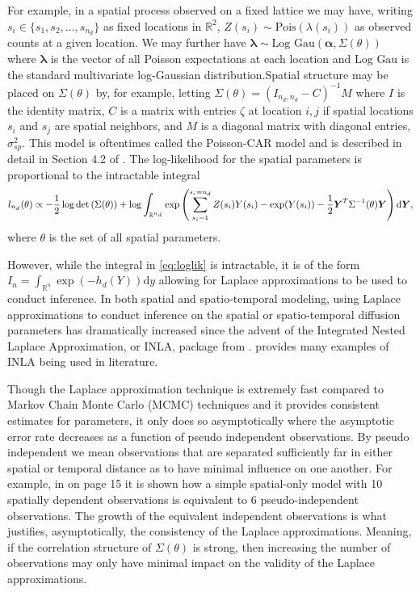 \documentclass[11pt]{isuthesis}
\begin{document}
	For example, in a spatial process observed on a fixed lattice we may have, writing $s_i \in \{s_1,s_2,...,s_{n_d}\}$ as fixed locations in $\mathbb{R}^2$, $Z(s_i)\sim \mbox{Pois}(\lambda(s_i))$ as observed counts at a given location.  We may further have $\boldsymbol{\lambda} \sim \mbox{Log Gau} (\boldsymbol{\alpha}, \Sigma(\theta))$ where $\boldsymbol{\lambda}$ is the vector of all Poisson expectations at each location and $\mbox{Log Gau}$ is the standard multivariate log-Gaussian distribution.Spatial structure may be placed on $\Sigma(\theta)$ by, for example, letting $\Sigma(\theta) = (I_{n_d,n_d}-C)^{-1}M$ where $I$ is the identity matrix, $C$ is a matrix with entries   $\zeta$ at location $i,j$ if spatial locations $s_i$ and $s_j$ are spatial neighbors, and $M$ is a diagonal matrix with diagonal entries, $\sigma_{sp}^2$.  This model is oftentimes called the Poisson-CAR model and is described in detail in Section 4.2 of \cite{cressie2015statistics}.  The log-likelihood for the spatial parameters is proportional to the intractable integral
	\begin{equation}
	\small l_{n_d}(\theta) \propto -\frac{1}{2}\log \det \left(\Sigma (\theta)\right) + \log \int_{\mathbb{R}^{n_d}} \exp \left(\sum_{s_i=1}^{s_i={n_d}} Z(s_i)Y(s_i)-\exp(Y(s_i)) - \frac{1}{2} \boldsymbol{Y}^T \Sigma^{-1}(\theta) \boldsymbol{Y} \right) \text{d} \boldsymbol{Y} \label{eq:loglik},
	\end{equation}
	where $\theta$ is the set of all spatial parameters.
	
	
	However, while the integral in \eqref{eq:loglik} is intractable, it is of the form $I_n = \int_{\mathbb{R}^n} \exp(-h_{d}\left(Y\right)) \text{d}y$ allowing for Laplace approximations to be used to conduct inference.  In both spatial and spatio-temporal modeling, using Laplace approximations to conduct inference on the spatial or spatio-temporal diffusion parameters has dramatically increased since the advent of the Integrated Nested Laplace Approximation, or INLA, package from \cite{rue2009approximate}.  \cite{rue2017bayesian} provides many examples of INLA being used in literature.
	
	Though the Laplace approximation technique is extremely fast compared to Markov Chain Monte Carlo (MCMC) techniques and it provides consistent estimates for parameters, it only does so asymptotically where the asymptotic error rate decreases as a function of pseudo independent observations.  By pseudo independent we mean observations that are separated sufficiently far in either spatial or temporal distance as to have minimal influence on one another.  For example, in \cite{cressie1992statistics} on page 15 it is shown how a simple spatial-only model with 10 spatially dependent observations is equivalent to 6 pseudo-independent observations.  The growth of the equivalent independent observations is what justifies, asymptotically, the consistency of the Laplace approximations.  Meaning, if the correlation structure of $\Sigma(\theta)$ is strong, then increasing the number of observations may only have minimal impact on the validity of the Laplace approximations. 
	
\end{document}

